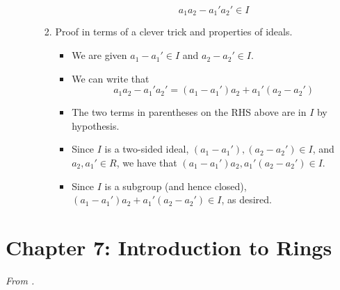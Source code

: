 \documentclass[../notes.tex]{subfiles}
\begin{document}
\begin{itemize}
\begin{itemize}
\begin{enumerate}
\begin{itemize}
\begin{equation*}
                    a_1a_2-a_1'a_2' \in I
                \end{equation*}
            \end{itemize}
            \item Proof in terms of a clever trick and properties of ideals.
            \begin{itemize}
                \item We are given $a_1-a_1'\in I$ and $a_2-a_2'\in I$.
                \item We can write that
                \begin{equation*}
                    a_1a_2-a_1'a_2' = (a_1-a_1')a_2+a_1'(a_2-a_2')
                \end{equation*}
                \item The two terms in parentheses on the RHS above are in $I$ by hypothesis.
                \item Since $I$ is a two-sided ideal, $(a_1-a_1'),(a_2-a_2')\in I$, and $a_2,a_1'\in R$, we have that $(a_1-a_1')a_2,a_1'(a_2-a_2')\in I$.
                \item Since $I$ is a subgroup (and hence closed), $(a_1-a_1')a_2+a_1'(a_2-a_2')\in I$, as desired.
            \end{itemize}
        \end{enumerate}
    \end{itemize}
\end{itemize}



\section{Chapter 7: Introduction to Rings}
\emph{From \textcite{bib:DummitFoote}.}
\end{document}
